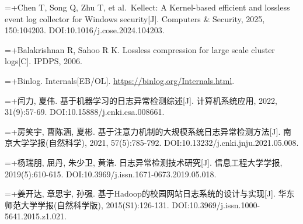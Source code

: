 {\noindent\hangindent=\dimexpr\thesisrefnumwd+\thesisrefgap\relax{}\makebox[\thesisrefnumwd][l]{[21]}\nobreak\hspace{\thesisrefgap}Chen T, Song Q, Zhu T, et al.~Kellect: A Kernel-based efficient and lossless event log collector for Windows security{[}J{]}. Computers \& Security, 2025, 150:104203. DOI:10.1016/j.cose.2024.104203.\par

\noindent\hangindent=\dimexpr\thesisrefnumwd+\thesisrefgap\relax{}\makebox[\thesisrefnumwd][l]{[22]}\nobreak\hspace{\thesisrefgap}Balakrishnan R, Sahoo R K. Lossless compression for large scale cluster logs{[}C{]}. IPDPS, 2006.\par

\noindent\hangindent=\dimexpr\thesisrefnumwd+\thesisrefgap\relax{}\makebox[\thesisrefnumwd][l]{[23]}\nobreak\hspace{\thesisrefgap}Binlog. Internals{[}EB/OL{]}. \url{https://binlog.org/Internals.html}.\par

\noindent\hangindent=\dimexpr\thesisrefnumwd+\thesisrefgap\relax{}\makebox[\thesisrefnumwd][l]{[24]}\nobreak\hspace{\thesisrefgap}闫力, 夏伟. 基于机器学习的日志异常检测综述{[}J{]}. 计算机系统应用, 2022, 31(9):57-69. DOI:10.15888/j.cnki.csa.008661.\par

\noindent\hangindent=\dimexpr\thesisrefnumwd+\thesisrefgap\relax{}\makebox[\thesisrefnumwd][l]{[25]}\nobreak\hspace{\thesisrefgap}房笑宇, 曹陈涵, 夏彬. 基于注意力机制的大规模系统日志异常检测方法{[}J{]}. 南京大学学报(自然科学), 2021, 57(5):785-792. DOI:10.13232/j.cnki.jnju.2021.05.008.\par

\noindent\hangindent=\dimexpr\thesisrefnumwd+\thesisrefgap\relax{}\makebox[\thesisrefnumwd][l]{[26]}\nobreak\hspace{\thesisrefgap}杨瑞朋, 屈丹, 朱少卫, 黄浩. 日志异常检测技术研究{[}J{]}. 信息工程大学学报, 2019(5):610-615. DOI:10.3969/j.issn.1671-0673.2019.05.018.\par

\noindent\hangindent=\dimexpr\thesisrefnumwd+\thesisrefgap\relax{}\makebox[\thesisrefnumwd][l]{[27]}\nobreak\hspace{\thesisrefgap}姜开达, 章思宇, 孙强. 基于Hadoop的校园网站日志系统的设计与实现{[}J{]}. 华东师范大学学报(自然科学版), 2015(S1):126-131. DOI:10.3969/j.issn.1000-5641.2015.z1.021.\par

}
